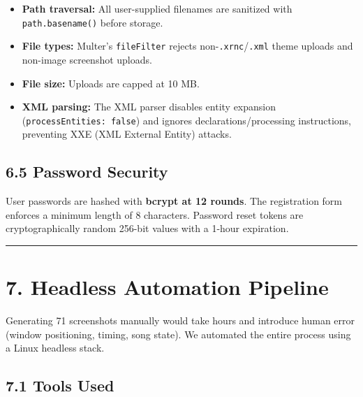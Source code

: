 \documentclass[
  11pt,
  oneside]{report}
\providecommand{\tightlist}{%
  \setlength{\itemsep}{0pt}\setlength{\parskip}{0pt}}
\begin{document}
\begin{itemize}
\tightlist
\item
  \textbf{Path traversal:} All user-supplied filenames are sanitized
  with \texttt{path.basename()} before storage.
\item
  \textbf{File types:} Multer's \texttt{fileFilter} rejects
  non-\texttt{.xrnc}/\texttt{.xml} theme uploads and non-image
  screenshot uploads.
\item
  \textbf{File size:} Uploads are capped at 10 MB.
\item
  \textbf{XML parsing:} The XML parser disables entity expansion
  (\texttt{processEntities:\ false}) and ignores declarations/processing
  instructions, preventing XXE (XML External Entity) attacks.
\end{itemize}

\subsection{6.5 Password Security}\label{password-security}

User passwords are hashed with \textbf{bcrypt at 12 rounds}. The
registration form enforces a minimum length of 8 characters. Password
reset tokens are cryptographically random 256-bit values with a 1-hour
expiration.

\begin{center}\rule{0.5\linewidth}{0.5pt}\end{center}

\section{7. Headless Automation
Pipeline}\label{headless-automation-pipeline}

Generating 71 screenshots manually would take hours and introduce human
error (window positioning, timing, song state). We automated the entire
process using a Linux headless stack.

\subsection{7.1 Tools Used}\label{tools-used}
\end{document}
